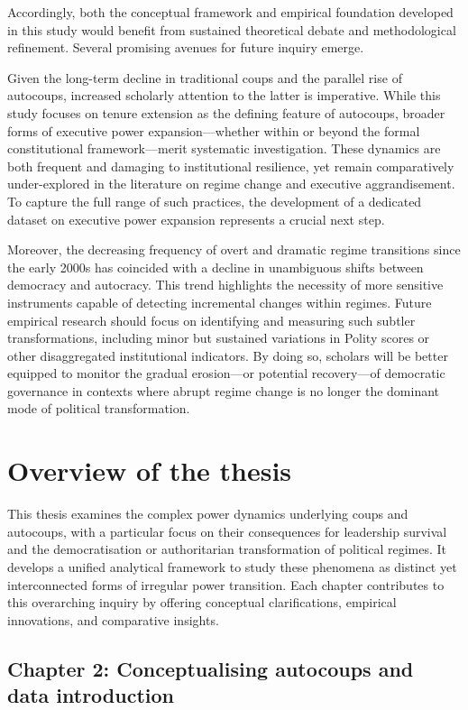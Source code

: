 \documentclass[
  12pt,
]{report}
\begin{document}
Accordingly, both the conceptual framework and empirical foundation
developed in this study would benefit from sustained theoretical debate
and methodological refinement. Several promising avenues for future
inquiry emerge.

Given the long-term decline in traditional coups and the parallel rise
of autocoups, increased scholarly attention to the latter is imperative.
While this study focuses on tenure extension as the defining feature of
autocoups, broader forms of executive power expansion---whether within
or beyond the formal constitutional framework---merit systematic
investigation. These dynamics are both frequent and damaging to
institutional resilience, yet remain comparatively under-explored in the
literature on regime change and executive aggrandisement. To capture the
full range of such practices, the development of a dedicated dataset on
executive power expansion represents a crucial next step.

Moreover, the decreasing frequency of overt and dramatic regime
transitions since the early 2000s has coincided with a decline in
unambiguous shifts between democracy and autocracy. This trend
highlights the necessity of more sensitive instruments capable of
detecting incremental changes within regimes. Future empirical research
should focus on identifying and measuring such subtler transformations,
including minor but sustained variations in Polity scores or other
disaggregated institutional indicators. By doing so, scholars will be
better equipped to monitor the gradual erosion---or potential
recovery---of democratic governance in contexts where abrupt regime
change is no longer the dominant mode of political transformation.

\section{Overview of the thesis}\label{overview-of-the-thesis}

This thesis examines the complex power dynamics underlying coups and
autocoups, with a particular focus on their consequences for leadership
survival and the democratisation or authoritarian transformation of
political regimes. It develops a unified analytical framework to study
these phenomena as distinct yet interconnected forms of irregular power
transition. Each chapter contributes to this overarching inquiry by
offering conceptual clarifications, empirical innovations, and
comparative insights.

\subsection*{Chapter 2: Conceptualising autocoups and data
introduction}\label{chapter-2-conceptualising-autocoups-and-data-introduction}
\end{document}
